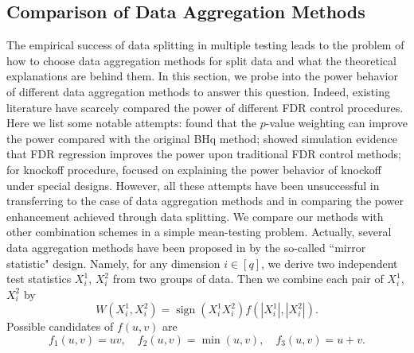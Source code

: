 \documentclass[12pt]{article}
\newcommand{\abs}[1]{\left\lvert#1\right\rvert}
\theoremstyle{plain}
\begin{document}
\subsection{Comparison of Data Aggregation Methods } \label{sec:compare}
The empirical success of data splitting in multiple testing leads to the problem of how to choose data aggregation methods for split data and what the theoretical explanations are behind them. In this section, we probe into the power behavior of different data aggregation methods to answer this question. Indeed, existing literature have scarcely compared the power of different FDR control procedures. Here we list some notable attempts: \cite{genovese2006false} found that the $p$-value weighting can improve the power compared with the original BHq method; \cite{scott2015false} showed simulation evidence that FDR regression improves the power upon traditional FDR control methods; for knockoff procedure,  \cite{liu2019power,weinstein2020power} focused on explaining the power behavior of knockoff under special designs. 
However, all these attempts have been unsuccessful in transferring to the case of data aggregation methods and in comparing the power enhancement achieved through data splitting.
We compare our methods with other combination schemes in a simple mean-testing problem. Actually, several data aggregation methods have been proposed in \cite{dai2022false} by the so-called ``mirror statistic" design. Namely, for any dimension $i\in [q]$, we derive two independent test statistics $X^1_i$, $X^2_i$ from two groups of data. Then we combine each pair of $X^1_i$, $X^2_i$ by 
\begin{equation}\label{eq:mirror}
	W(X^1_i,X^2_i)=\operatorname{sign}(X^1_i X^2_i )f(\abs{X^1_i},\abs{X^2_i} ).
\end{equation}
Possible candidates of $f(u,v)$ are 
\begin{equation}\label{eq:mirror-choice}
	f_1(u, v)=u v, \quad f_2(u, v)= \min (u, v),\quad f_3(u, v)=u+v.
\end{equation}
\end{document}
